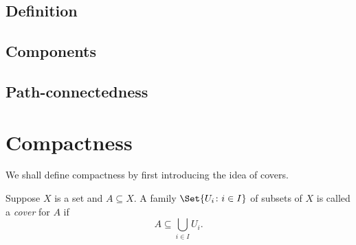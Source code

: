 \documentclass[main.tex]{subfiles}
\begin{document}
	\subsection{Definition}
	
	\subsection{Components}
	
	\subsection{Path-connectedness}
	
	\section{Compactness}
	We shall define compactness by first introducing the idea of covers.
	\begin{definition}
		Suppose $X$ is a set and $A \subseteq X$. A family $\Set{U_i \colon i \in I}$ of subsets of $X$ is called a \textit{cover}  for $A$ if
		\begin{equation*}
			A \subseteq\bigcup_{i \in I} U_i.
		\end{equation*}
	\end{definition}
\end{document}
